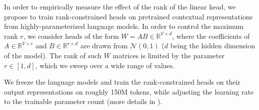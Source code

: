 In order to empirically measure the effect of the rank of the linear head, we propose to train rank-constrained heads on pretrained contextual representations from highly-parameterized language models. In order to control the maximum rank $r$, we consider heads of the form $W = AB \in \mathbb{R}^{V \times d}$, where the coefficients of $A \in \mathbb{R}^{V \times r}$ and $B \in \mathbb{R}^{r \times d}$ are drawn from $\mathcal{N}(0, 1)$ ($d$ being the hidden dimension of the model). The rank of such $W$ matrices is limited by the parameter $r \in [1, d]$, which we sweep over a wide range of values.

We freeze the language models and train the rank-constrained heads on their output representations on roughly 150M tokens, while adjusting the learning rate to the trainable parameter count (more details in ).

